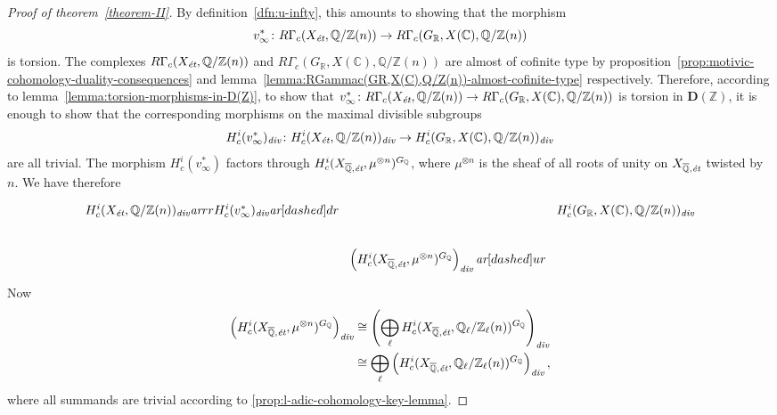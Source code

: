 \documentclass[leqno,12pt]{article}
\theoremstyle{plain}
\theoremstyle{definition}
\newcommand{\CC}{\mathbb{C}}
\newcommand{\QQ}{\mathbb{Q}}
\newcommand{\RR}{\mathbb{R}}
\newcommand{\ZZ}{\mathbb{Z}}
\renewcommand{\div}{\text{\it div}}
\newcommand{\ar}{\text{\it ar}}
\newcommand{\et}{\text{\it \'{e}t}}
\begin{document}
\begin{proof}[Proof of theorem~\ref{theorem-II}]
  By definition~\ref{dfn:u-infty}, this amounts to showing that the morphism
  $$v_\infty^*\colon R\Gamma_c (X_\et, \QQ/\ZZ (n)) \to R\Gamma_c (G_\RR, X (\CC), \QQ/\ZZ (n))$$
  is torsion. The complexes $R\Gamma_c (X_\et, \QQ/\ZZ (n))$ and
  $R\Gamma_c (G_\RR, X (\CC), \QQ/\ZZ (n))$ are almost of cofinite type by
  proposition~\ref{prop:motivic-cohomology-duality-consequences} and
  lemma~\ref{lemma:RGammac(GR,X(C),Q/Z(n))-almost-cofinite-type} respectively.
  Therefore, according to lemma~\ref{lemma:torsion-morphisms-in-D(Z)}, to show
  that
  $v^*_\infty\colon R\Gamma_c (X_\et, \QQ/\ZZ (n)) \to R\Gamma_c (G_\RR, X
  (\CC), \QQ/\ZZ (n))$ is torsion in $\mathbf{D} (\ZZ)$, it is enough to show
  that the corresponding morphisms on the maximal divisible subgroups
  \[ H^i_c (v^*_\infty)_\div\colon H^i_c (X_\et, \QQ/\ZZ (n))_\div \to
     H^i_c (G_\RR, X (\CC), \QQ/\ZZ (n))_\div \]
  are all trivial. The morphism $H^i_c (v^*_\infty)$ factors through
  $H^i_c (X_{\overline{\QQ}, \text{\it \'{e}t}}, \mu^{\otimes n})^{G_\QQ}$, where
  $\mu^{\otimes n}$ is the sheaf of all roots of unity on
  $X_{\overline{\QQ}, \text{\it \'{e}t}}$ twisted by $n$.
  We have therefore
  \[ \begin{tikzcd}[column sep=0pt]
    H^i_c (X_\et, \QQ/\ZZ (n))_\div\ar{rr}{H^i_c (v^*_\infty)_\div}\ar[dashed]{dr} && H^i_c (G_\RR, X (\CC), \QQ/\ZZ (n))_\div\\
    & \left(H^i_c (X_{\overline{\QQ}, \text{\it \'{e}t}}, \mu^{\otimes n})^{G_\QQ}\right)_\div\ar[dashed]{ur}
  \end{tikzcd} \]
  Now
  \begin{align*}
    \left(H^i_c (X_{\overline{\QQ}, \text{\it \'{e}t}}, \mu^{\otimes n})^{G_\QQ}\right)_\div & \cong
                                                                                               \left(\bigoplus_\ell H^i_c (X_{\overline{\QQ}, \text{\it \'{e}t}}, \QQ_\ell/\ZZ_\ell (n))^{G_\QQ}\right)_\div \\
                                                                                             & \cong
                                                                                               \bigoplus_\ell \left(H^i_c (X_{\overline{\QQ}, \text{\it \'{e}t}}, \QQ_\ell/\ZZ_\ell (n))^{G_\QQ}\right)_\div,
  \end{align*}
  where all summands are trivial according to
  \ref{prop:l-adic-cohomology-key-lemma}.
\end{proof}
\end{document}
